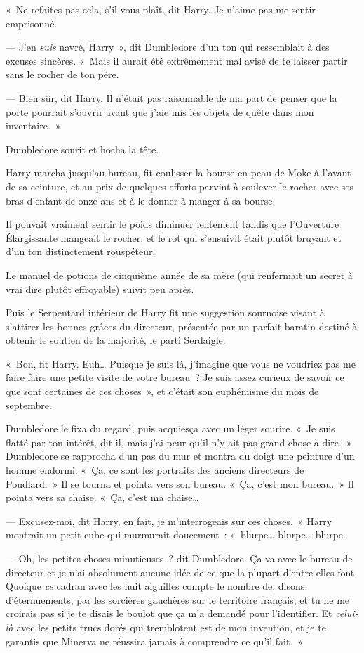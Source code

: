 «~Ne refaites pas cela, s'il vous plaît, dit Harry.
Je n'aime pas me sentir emprisonné.

--- J'en \emph{suis} navré, Harry~», dit Dumbledore d'un ton qui ressemblait à des excuses sincères.
«~Mais il aurait été extrêmement mal avisé de te laisser partir sans le rocher de ton père.

--- Bien sûr, dit Harry.
Il n'était pas raisonnable de ma part de penser que la porte pourrait s'ouvrir avant que j'aie mis les objets de quête dans mon inventaire.~»

Dumbledore sourit et hocha la tête.

Harry marcha jusqu'au bureau, fit coulisser la bourse en peau de Moke à l'avant de sa ceinture, et au prix de quelques efforts parvint à soulever le rocher avec ses bras d'enfant de onze ans et à le donner à manger à sa bourse.

Il pouvait vraiment sentir le poids diminuer lentement tandis que l'Ouverture Élargissante mangeait le rocher, et le rot qui s'ensuivit était plutôt bruyant et d'un ton distinctement rouspéteur.

Le manuel de potions de cinquième année de sa mère (qui renfermait un secret à vrai dire plutôt effroyable) suivit peu après.

Puis le Serpentard intérieur de Harry fit une suggestion sournoise visant à s'attirer les bonnes grâces du directeur, présentée par un parfait baratin destiné à obtenir le soutien de la majorité, le parti Serdaigle.

«~Bon, fit Harry.
Euh… Puisque je suis là, j'imagine que vous ne voudriez pas me faire faire une petite visite de votre bureau~?
Je suis assez curieux de savoir ce que sont certaines de ces choses~», et c'était son euphémisme du mois de septembre.

Dumbledore le fixa du regard, puis acquiesça avec un léger sourire.
«~Je suis flatté par ton intérêt, dit-il, mais j'ai peur qu'il n'y ait pas grand-chose à dire.~»
Dumbledore se rapprocha d'un pas du mur et montra du doigt une peinture d'un homme endormi.
«~Ça, ce sont les portraits des anciens directeurs de Poudlard.~»
Il se tourna et pointa vers son bureau.
«~Ça, c'est mon bureau.~»
Il pointa vers sa chaise.
«~Ça, c'est ma chaise…

--- Excusez-moi, dit Harry, en fait, je m'interrogeais sur ces choses.~»
Harry montrait un petit cube qui murmurait doucement~: «~blurpe… blurpe… blurpe.

--- Oh, les petites choses minutieuses~? dit Dumbledore.
Ça va avec le bureau de directeur et je n'ai absolument aucune idée de ce que la plupart d'entre elles font.
Quoique \emph{ce} cadran avec les huit aiguilles compte le nombre de, disons d'éternuements, par les sorcières gauchères sur le territoire français, et tu ne me croirais pas si je te disais le boulot que ça m'a demandé pour l'identifier.
Et \emph{celui-là} avec les petits trucs dorés qui tremblotent est de mon invention, et je te garantis que Minerva ne réussira jamais à comprendre ce qu'il fait.~»

